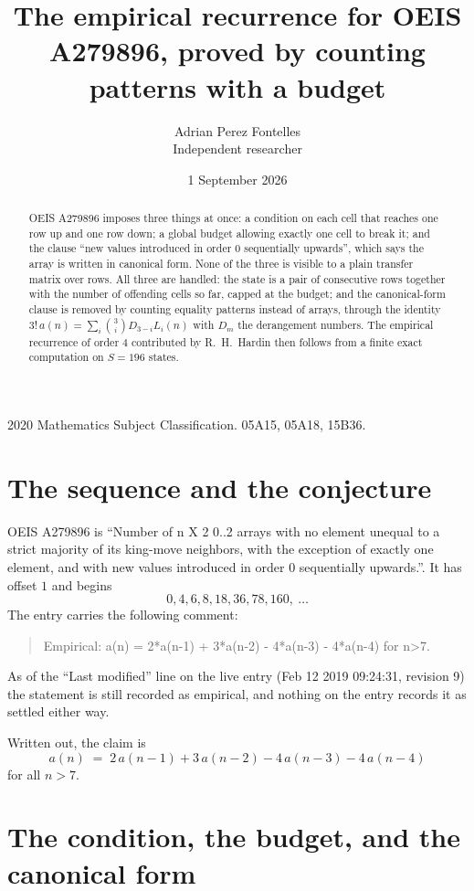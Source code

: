 \documentclass[11pt,a4paper]{article}
\title{The empirical recurrence for OEIS A279896, proved by counting patterns with a budget}
\author{Adrian Perez Fontelles\\ \small Independent researcher}
\date{1 September 2026}
\theoremstyle{plain}
\theoremstyle{definition}
\begin{document}
\maketitle

\begin{abstract}
OEIS A279896 imposes three things at once: a condition on each cell that reaches one row up and
one row down; a global budget allowing exactly one cell to
break it; and the clause ``new values introduced in order $0$ sequentially upwards'', which
says the array is written in canonical form. None of the three is visible to a plain transfer
matrix over rows. All three are handled: the state is a pair of consecutive rows
together with the number of offending cells so far, capped at the budget; and the
canonical-form clause is removed by counting equality patterns instead of arrays, through the
identity $3!\,a(n)=\sum_i\binom{3}{i}D_{3-i}L_i(n)$ with $D_m$ the derangement
numbers. The empirical recurrence of order $4$ contributed by R.~H.~Hardin then follows
from a finite exact computation on $S=196$ states.
\end{abstract}

\noindent\small 2020 Mathematics Subject Classification. 05A15, 05A18, 15B36.\normalsize

\section{The sequence and the conjecture}

OEIS A279896 is ``Number of n X 2 0..2 arrays with no element unequal to a strict majority of its king-move neighbors, with the exception of exactly one element, and with new values introduced in order 0 sequentially upwards.''. It has offset $1$ and begins
\[
0, 4, 6, 8, 18, 36, 78, 160,\ \dots
\]
The entry carries the following comment:
\begin{quote}\small
Empirical: a(n) = 2*a(n-1) + 3*a(n-2) - 4*a(n-3) - 4*a(n-4) for n>7.
\end{quote}
As of the ``Last modified'' line on the live entry (Feb 12 2019 09:24:31, revision 9) the statement is
still recorded as empirical, and nothing on the entry records it as settled either way.

Written out, the claim is
\begin{equation}\label{eq:conj}
a(n)\;=\;2\,a(n-1) + 3\,a(n-2) - 4\,a(n-3) - 4\,a(n-4)
\end{equation}
for all $n>7$.

\section{The condition, the budget, and the canonical form}
\end{document}
